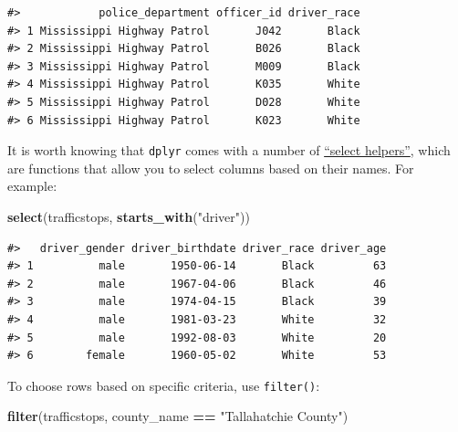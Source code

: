 \documentclass[]{book}
\newenvironment{Shaded}{\begin{snugshade}}{\end{snugshade}}
\newcommand{\KeywordTok}[1]{\textcolor[rgb]{0.13,0.29,0.53}{\textbf{#1}}}
\newcommand{\StringTok}[1]{\textcolor[rgb]{0.31,0.60,0.02}{#1}}
\newcommand{\OperatorTok}[1]{\textcolor[rgb]{0.81,0.36,0.00}{\textbf{#1}}}
\newcommand{\NormalTok}[1]{#1}
\theoremstyle{definition}
\theoremstyle{definition}
\theoremstyle{definition}
\theoremstyle{remark}
\begin{document}
\begin{verbatim}
#>            police_department officer_id driver_race
#> 1 Mississippi Highway Patrol       J042       Black
#> 2 Mississippi Highway Patrol       B026       Black
#> 3 Mississippi Highway Patrol       M009       Black
#> 4 Mississippi Highway Patrol       K035       White
#> 5 Mississippi Highway Patrol       D028       White
#> 6 Mississippi Highway Patrol       K023       White
\end{verbatim}

It is worth knowing that \texttt{dplyr} comes with a number of
\href{https://www.rdocumentation.org/packages/dplyr/versions/0.7.2/topics/select_helpers}{``select
helpers''}, which are functions that allow you to select columns based
on their names. For example:

\begin{Shaded}
\begin{Highlighting}[]
\KeywordTok{select}\NormalTok{(trafficstops, }\KeywordTok{starts_with}\NormalTok{(}\StringTok{"driver"}\NormalTok{))}
\end{Highlighting}
\end{Shaded}

\begin{verbatim}
#>   driver_gender driver_birthdate driver_race driver_age
#> 1          male       1950-06-14       Black         63
#> 2          male       1967-04-06       Black         46
#> 3          male       1974-04-15       Black         39
#> 4          male       1981-03-23       White         32
#> 5          male       1992-08-03       White         20
#> 6        female       1960-05-02       White         53
\end{verbatim}

To choose rows based on specific criteria, use \texttt{filter()}:

\begin{Shaded}
\begin{Highlighting}[]
\KeywordTok{filter}\NormalTok{(trafficstops, county_name }\OperatorTok{==}\StringTok{ "Tallahatchie County"}\NormalTok{)}
\end{Highlighting}
\end{Shaded}
\end{document}
